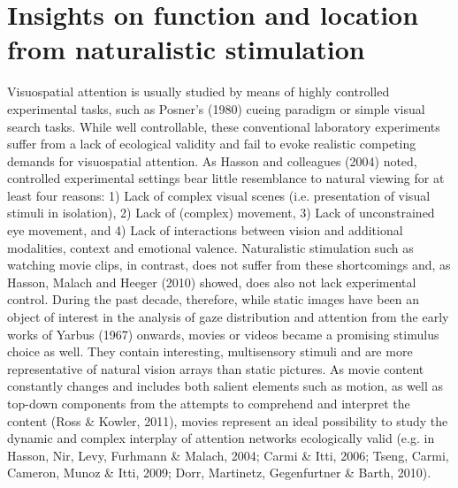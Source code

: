 \documentclass[a4paper, 11pt]{scrreprt}
\begin{document}
\section{Insights on function and location from naturalistic stimulation}
Visuospatial attention is usually studied by means of highly controlled experimental tasks, such as Posner’s (1980) cueing paradigm or simple visual search tasks. While well controllable, these conventional laboratory experiments suffer from a lack of ecological validity and fail to evoke realistic competing demands for visuospatial attention. As Hasson and colleagues (2004) noted, controlled experimental settings bear little resemblance to natural viewing for at least four reasons: 1) Lack of complex visual scenes (i.e. presentation of visual stimuli in isolation), 2) Lack of (complex) movement, 3) Lack of unconstrained eye movement, and 4) Lack of interactions between vision and additional modalities, context and emotional valence. Naturalistic stimulation such as watching movie clips, in contrast, does not suffer from these shortcomings and, as Hasson, Malach and Heeger (2010) showed, does also not lack experimental control. During the past decade, therefore, while static images have been an object of interest in the analysis of gaze distribution and attention from the early works of Yarbus (1967) onwards, movies or videos became a promising stimulus choice as well. They contain interesting, multisensory stimuli and are more representative of natural vision arrays than static pictures. As movie content constantly changes and includes both salient elements such as motion, as well as top-down components from the attempts to comprehend and interpret the content (Ross \& Kowler, 2011), movies represent an ideal possibility to study the dynamic and complex interplay of attention networks ecologically valid   (e.g. in Hasson, Nir, Levy, Furhmann \& Malach, 2004; Carmi \& Itti, 2006; Tseng, Carmi, Cameron, Munoz \& Itti, 2009; Dorr, Martinetz, Gegenfurtner \& Barth, 2010). \newline
\end{document}
